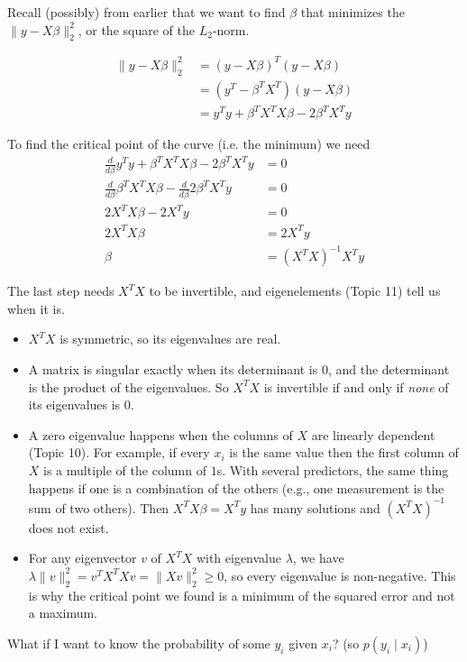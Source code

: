 Recall (possibly) from earlier that we want to find $\beta$ that minimizes the $\|y-X\beta\|^2_2$, 
or the square of the $L_2$-norm. 

\begin{align*}
\|y-X\beta\|^2_2 & = (y-X\beta)^T(y-X\beta)\\
& =  (y^T-\beta^TX^T)(y-X\beta)\\
& = y^Ty + \beta^TX^TX\beta - 2 \beta^TX^Ty
\end{align*}

To find the critical point of the curve (i.e. the minimum) we need
\begin{align*}
\frac{d}{d\beta} y^Ty + \beta^TX^TX\beta - 2 \beta^TX^Ty &= 0\\
\frac{d}{d\beta}\beta^TX^TX\beta  - \frac{d}{d\beta}2 \beta^TX^Ty &= 0\\
2 X^TX\beta - 2 X^Ty &=0\\
2 X^TX\beta &= 2 X^Ty \\
\beta &= (X^TX)^{-1}X^Ty
\end{align*}

\begin{aside}
The last step needs $X^TX$ to be invertible, and eigenelements (Topic 11) tell us when it is.
\begin{itemize}
\item $X^TX$ is symmetric, so its eigenvalues are real.
\item A matrix is singular exactly when its determinant is $0$, and the determinant is the product of the eigenvalues. So $X^TX$ is invertible if and only if \emph{none} of its eigenvalues is $0$.
\item A zero eigenvalue happens when the columns of $X$ are linearly dependent (Topic 10). For example, if every $x_i$ is the same value then the first column of $X$ is a multiple of the column of $1$s. With several predictors, the same thing happens if one is a combination of the others (e.g., one measurement is the sum of two others). Then $X^TX\beta=X^Ty$ has many solutions and $(X^TX)^{-1}$ does not exist.
\item For any eigenvector $v$ of $X^TX$ with eigenvalue $\lambda$, we have $\lambda\|v\|_2^2=v^TX^TXv=\|Xv\|_2^2\ge0$, so every eigenvalue is non-negative. This is why the critical point we found is a minimum of the squared error and not a maximum.
\end{itemize}
\end{aside}

What if I want to know the probability of some $y_i$ given $x_i$? (so $p(y_i\mid x_i)$)


